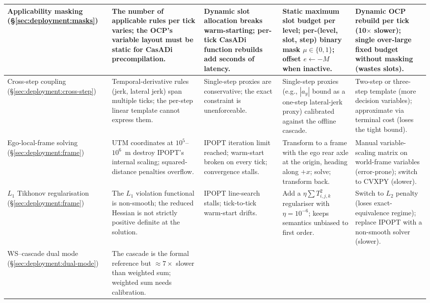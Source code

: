 \begin{table}[t]
\begin{tabularx}{\linewidth}{@{}l X X X X@{}}
        \midrule
        Applicability masking (\S\ref{sec:deployment:masks})
            & The number of applicable rules per tick varies; the OCP's variable layout must be static for CasADi precompilation.
            & Dynamic slot allocation breaks warm-starting; per-tick CasADi function rebuilds add seconds of latency.
            & Static maximum slot budget per level; per-(level, slot, step) binary mask $\mu \in \{0,1\}$; offset $e \leftarrow -M$ when inactive.
            & Dynamic OCP rebuild per tick (10$\times$ slower); single over-large fixed budget without masking (wastes slots). \\
        \midrule
        Cross-step coupling (\S\ref{sec:deployment:cross-step})
            & Temporal-derivative rules (jerk, lateral jerk) span multiple ticks; the per-step linear template cannot express them.
            & Single-step proxies are conservative; the exact constraint is unenforceable.
            & Single-step proxies (e.g., $|a_y|$ bound as a one-step lateral-jerk proxy) calibrated against the offline cascade.
            & Two-step or three-step template (more decision variables); approximate via terminal cost (loses the tight bound). \\
        \midrule
        Ego-local-frame solving (\S\ref{sec:deployment:frame})
            & UTM coordinates at $10^{5}$--$10^{6}$~m destroy IPOPT's internal scaling; squared-distance penalties overflow.
            & IPOPT iteration limit reached; warm-start broken on every tick; convergence stalls.
            & Transform to a frame with the ego rear axle at the origin, heading along $+x$; solve; transform back.
            & Manual variable-scaling matrix on world-frame variables (error-prone); switch to CVXPY (slower). \\
        \midrule
        $L_1$ Tikhonov regularisation (\S\ref{sec:deployment:frame})
            & The $L_1$ violation functional is non-smooth; the reduced Hessian is not strictly positive definite at the solution.
            & IPOPT line-search stalls; tick-to-tick warm-start drifts.
            & Add a $\eta \sum T_{i,j,k}^2$ regulariser with $\eta = 10^{-6}$; keeps semantics unbiased to first order.
            & Switch to $L_2$ penalty (loses exact-equivalence regime); replace IPOPT with a non-smooth solver (slower). \\
        \midrule
        WS--cascade dual mode (\S\ref{sec:deployment:dual-mode})
            & The cascade is the formal reference but $\approx 7\times$ slower than weighted sum; weighted sum needs calibration.

\end{tabularx}
\end{table}
